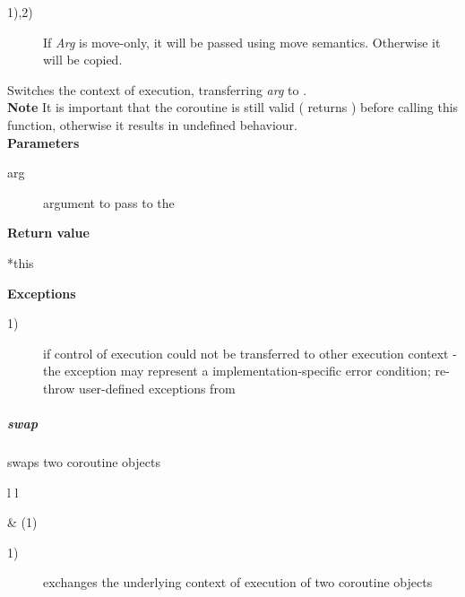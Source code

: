 \begin{description}
    \item[1),2)] If \textit{Arg} is move-only, it will be passed using
        move semantics. Otherwise it will be copied.\\
\end{description}

Switches the context of execution, transferring \textit{arg} to \corofunction.\\

{\bf Note}
\newline
It is important that the coroutine is still valid (
returns ) before calling this function, otherwise it results in
undefined behaviour.\\

{\bf Parameters}
\begin{description}
    \item[arg] argument to pass to the \corofunction\\
\end{description}

{\bf Return value}
\begin{description}
    \item[*this]
\end{description}

{\bf Exceptions}
\begin{description}
    \item[1)]  if control of execution could not be
              transferred to other execution context - the exception may
              represent a implementation-specific error condition; re-throw
              user-defined exceptions from \corofunction\\
\end{description}

\subparagraph*{swap}
swaps two coroutine objects\\

\begin{tabular}{ l l }
    \midrule

     & (1)\\

    \midrule
\end{tabular}

\begin{description}
    \item[1)] exchanges the underlying context of execution of two coroutine objects\\
\end{description}

